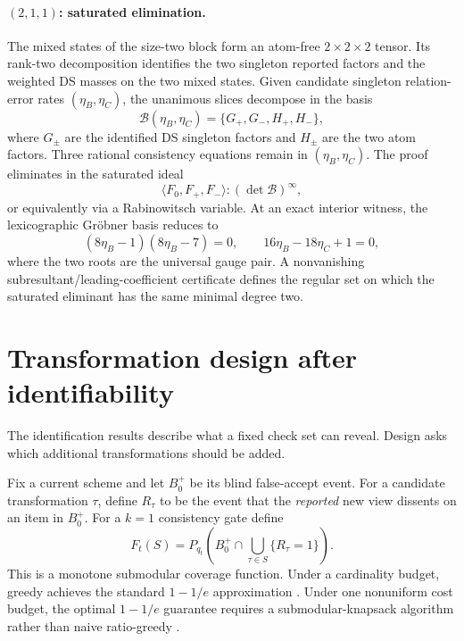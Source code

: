\documentclass[11pt]{article}
\theoremstyle{definition}
\theoremstyle{remark}
\begin{document}
\paragraph{$(2,1,1)$: saturated elimination.}
The mixed states of the size-two block form an atom-free $2\times2\times2$ tensor. Its rank-two decomposition identifies the two singleton reported factors and the weighted DS masses on the two mixed states. Given candidate singleton relation-error rates $(\eta_B,\eta_C)$, the unanimous slices decompose in the basis
\[
\mathcal B(\eta_B,\eta_C)=\{G_+,G_-,H_+,H_-\},
\]
where $G_\pm$ are the identified DS singleton factors and $H_\pm$ are the two atom factors. Three rational consistency equations remain in $(\eta_B,\eta_C)$. The proof eliminates in the saturated ideal
\[
\langle F_0,F_+,F_-\rangle:(\det\mathcal B)^\infty,
\]
or equivalently via a Rabinowitsch variable. At an exact interior witness, the lexicographic Gr\"obner basis reduces to
\[
(8\eta_B-1)(8\eta_B-7)=0,
\qquad
16\eta_B-18\eta_C+1=0,
\]
where the two roots are the universal gauge pair. A nonvanishing subresultant/leading-coefficient certificate defines the regular set on which the saturated eliminant has the same minimal degree two.

\section{Transformation design after identifiability}
\label{sec:design}

The identification results describe what a fixed check set can reveal. Design asks which additional transformations should be added.

Fix a current scheme and let $B_0^+$ be its blind false-accept event. For a candidate transformation $\tau$, define $R_\tau$ to be the event that the \emph{reported} new view dissents on an item in $B_0^+$. For a $k=1$ consistency gate define
\[
F_t(S)=P_{q_t}\left(B_0^+\cap\bigcup_{\tau\in S}\{R_\tau=1\}\right).
\]
This is a monotone submodular coverage function. Under a cardinality budget, greedy achieves the standard $1-1/e$ approximation \cite{nemhauser1978}. Under one nonuniform cost budget, the optimal $1-1/e$ guarantee requires a submodular-knapsack algorithm rather than naive ratio-greedy \cite{sviridenko2004}.
\end{document}
